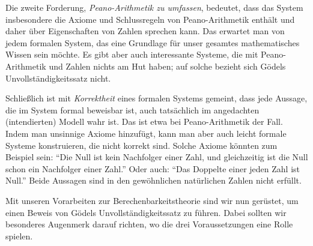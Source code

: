 \documentclass[twoside]{../zirkelblatt1415}
\theoremstyle{definition}
\theoremstyle{plain}
\theoremstyle{remark}
\begin{document}
Die zweite Forderung, \emph{Peano-Arithmetik zu umfassen}, bedeutet, dass das
System insbesondere die Axiome und Schlussregeln von Peano-Arithmetik enthält
und daher über Eigenschaften von Zahlen sprechen kann. Das erwartet man von
jedem formalen System, das eine Grundlage für unser gesamtes mathematisches
Wissen sein möchte. Es gibt aber auch interessante Systeme, die mit
Peano-Arithmetik und Zahlen nichts am Hut haben; auf solche bezieht sich Gödels
Unvollständigkeitssatz nicht.

Schließlich ist mit \emph{Korrektheit} eines formalen Systems gemeint, dass
jede Aussage, die im System formal beweisbar ist, auch tatsächlich im
angedachten (intendierten) Modell wahr ist. Das ist etwa bei
Peano-Arithmetik der Fall. Indem man unsinnige Axiome hinzufügt, kann man aber
auch leicht formale Systeme konstruieren, die nicht korrekt sind. Solche Axiome
könnten zum Beispiel sein: "`Die Null ist kein Nachfolger einer Zahl, und
gleichzeitig ist die Null schon ein Nachfolger einer Zahl."' Oder auch: "`Das
Doppelte einer jeden Zahl ist Null."' Beide Aussagen sind in den gewöhnlichen
natürlichen Zahlen nicht erfüllt.

Mit unseren Vorarbeiten zur Berechenbarkeitstheorie sind wir nun gerüstet, um
einen Beweis von Gödels Unvollständigkeitssatz zu führen. Dabei sollten wir
besonderes Augenmerk darauf richten, wo die drei Voraussetzungen eine Rolle
spielen.
\end{document}
